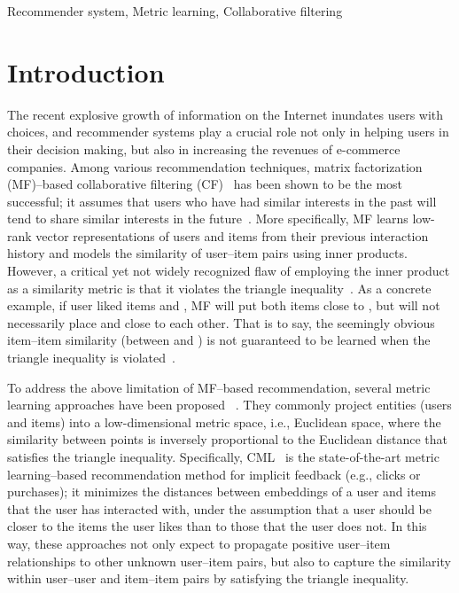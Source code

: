 \documentclass[conference]{IEEEtran}
\begin{document}
\begin{IEEEkeywords}
Recommender system, Metric learning, Collaborative filtering
\end{IEEEkeywords}

\section{Introduction}


The recent explosive growth of information on the Internet inundates users with choices, and recommender systems play a crucial role not only in helping users in their decision making, but also in increasing the revenues of e-commerce companies.
Among various recommendation techniques, matrix factorization (MF)--based collaborative filtering (CF)~\cite{koren2008factorization} has been shown to be the most successful; it assumes that users who have had similar interests in the past will tend to share similar interests in the future~\cite{bobadilla2013recommender}. More specifically, MF learns low-rank vector representations of users and items from their previous interaction history and models the similarity of user--item pairs using inner products. However, a critical yet not widely recognized flaw of employing the inner product as a similarity metric is that it violates the triangle inequality~\cite{ram2012maximum}. As a concrete example, if user  liked items  and , MF will put both items close to , but will not necessarily place  and  close to each other. That is to say, the seemingly obvious item--item similarity (between  and ) is not guaranteed to be learned when the triangle inequality is violated~\cite{hsieh2017collaborative}.


To address the above limitation of MF--based recommendation, several metric learning approaches have been proposed
~\cite{khoshneshin2010collaborative,chen2012playlist,feng2015personalized,hsieh2017collaborative}.
They commonly project entities (users and items) into a low-dimensional metric space, i.e., Euclidean space, where the similarity between points is inversely proportional to the Euclidean distance that satisfies the triangle inequality.
Specifically, CML~\cite{hsieh2017collaborative} is the state-of-the-art 
metric learning--based recommendation method for implicit feedback (e.g., clicks or purchases);
it minimizes the distances between embeddings of a user and items that the user has interacted with, under the assumption that a user should be closer to the items the user likes than to those that the user does not.
In this way, these approaches not only expect to propagate positive user--item relationships to other unknown user--item pairs, but also to capture the similarity within user--user and item--item pairs by satisfying the triangle inequality.
\end{document}
